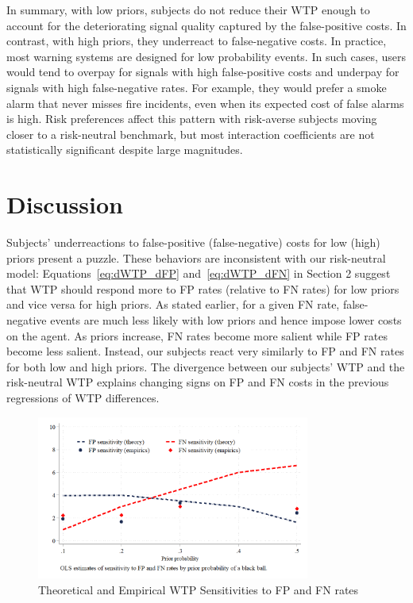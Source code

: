 \documentclass[12pt,a4paper]{article}
\begin{document}
In summary, with low priors, subjects do not reduce their WTP enough to account for the deteriorating signal quality captured by the false-positive costs. In contrast, with high priors, they underreact to false-negative costs. In practice, most warning systems are designed for low probability events. In such cases, users would tend to overpay for signals with high false-positive costs and underpay for signals with high false-negative rates. For example, they would prefer a smoke alarm that never misses fire incidents, even when its expected cost of false alarms is high. Risk preferences affect this pattern with risk-averse subjects moving closer to a risk-neutral benchmark, but most interaction coefficients are not statistically significant despite large magnitudes.


\section{Discussion}\label{sec:discussion}

Subjects' underreactions to false-positive (false-negative) costs for low (high) priors present a puzzle. These behaviors are inconsistent with our risk-neutral model: Equations~\ref{eq:dWTP_dFP} and~\ref{eq:dWTP_dFN} in Section 2 suggest that WTP should respond more to FP rates (relative to FN rates) for low priors and vice versa for high priors. As stated earlier, for a given FN rate, false-negative events are much less likely with low priors and hence impose lower costs on the agent. As priors increase, FN rates become more salient while FP rates become less salient. Instead, our subjects react very similarly to FP and FN rates for both low and high priors. The divergence between our subjects' WTP and the risk-neutral WTP explains changing signs on FP and FN costs in the previous regressions of WTP differences.



\begin{figure}[H]
\centering
\caption{Theoretical and Empirical WTP Sensitivities to FP and FN rates} \label{fig:Comparison}
\includegraphics[width=0.8\textwidth]{Graphs/sensit_comparison.png}
\end{figure}
\end{document}
